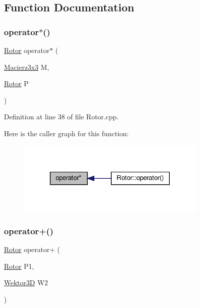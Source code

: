 \subsection{Function Documentation}
\mbox{\label{_rotor_8hh_a66cbe78735e95530c8eb1361b6fe40eb}} 
\subsubsection{\texorpdfstring{operator$\ast$()}{operator*()}}
{\footnotesize\ttfamily \hyperlink{class_rotor}{Rotor} operator$\ast$ (\begin{DoxyParamCaption}\item[{\hyperlink{_macierz3x3_8hh_ad4fc7b0e263d9a99ba6174f68b52ea87}{Macierz3x3}}]{M,  }\item[{\hyperlink{class_rotor}{Rotor}}]{P }\end{DoxyParamCaption})}



Definition at line 38 of file Rotor.\+cpp.

Here is the caller graph for this function\+:
\nopagebreak
\begin{figure}[H]
\begin{center}
\leavevmode
\includegraphics[width=260pt]{_rotor_8hh_a66cbe78735e95530c8eb1361b6fe40eb_icgraph}
\end{center}
\end{figure}
\mbox{\label{_rotor_8hh_a8e627d5e28005e4dc3a7ab7ae6e21f9b}} 
\subsubsection{\texorpdfstring{operator+()}{operator+()}\hspace{0.1cm}{\footnotesize\ttfamily [1/2]}}
{\footnotesize\ttfamily \hyperlink{class_rotor}{Rotor} operator+ (\begin{DoxyParamCaption}\item[{\hyperlink{class_rotor}{Rotor}}]{P1,  }\item[{\hyperlink{_wektor3_d_8hh_ac353a272b38b4ad342f7181ad7bdb91a}{Wektor3D}}]{W2 }\end{DoxyParamCaption})}



